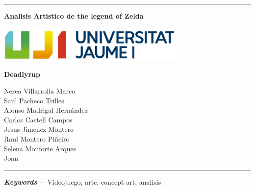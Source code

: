 \documentclass[12pt]{article}
\date{}
\providecommand{\keywords}[1]
{
  \small
  \textbf{\textit{Keywords---}} #1
}
\begin{document}
    \begin{titlepage}

        \centering
        \hrule
        \vspace{1cm}
        {\bfseries\huge Analisis Artistico de the legend of Zelda \par}
        \vspace{3cm}
        {\includegraphics[width=0.7\textwidth]{images/UJI_logo.jpg} \par}
        \vspace{4cm}
        {\LARGE \textbf{Deadlyrup} \par}

        {\large
        Nerea Villarrolla Marco \\
        Saul Pacheco Trilles \\
        Alonso Madrigal Hernández \\
        Carlos Castell Campos \\
        Jesus Jimenez Montero \\
        Raul Montero Piñeiro \\
        Selena Monforte Arques \\
        Joan \\
        \par}
        \vspace{10cm}
        \hrule

    \end{titlepage}

\newpage
\begin{abstract}
    En el siguiente documento hablaremos sobre las bases artisticas del videojuego "The Legend Of Zelda: Breath of the wild". Tanto del director de concept art como un atisbo de información sobre el juego. Finalemnete acabaremos con el analisis artistico profundo de varios fan arts.

\end{abstract}

\keywords{Videojuego, arte, concept art, analisis}

\newpage
\tableofcontents
\setcounter{tocdepth}{4}
\end{document}
